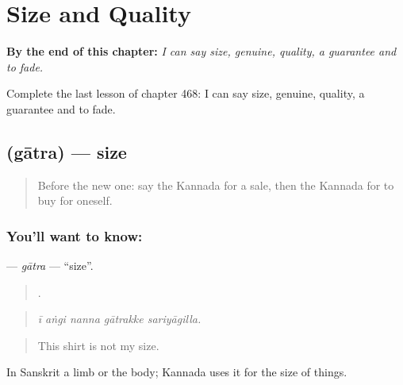 
\chapter{Size and Quality}
\label{ch:ka-size-and-quality}

\begin{chapteropening}
\textbf{By the end of this chapter:} \emph{I can say size, genuine, quality, a guarantee and to fade.}

Complete the last lesson of chapter 468: I can say size, genuine, quality, a guarantee and to fade.
\end{chapteropening}

\section[\texorpdfstring{\kn{ಗಾತ್ರ} (gātra)}{ಗಾತ್ರ (gātra)}]{ (gātra) — size}

\label{lesson:KA-C468-gatra}



\begin{quote}
Before the new one: say the Kannada for a sale, then the Kannada for to buy for oneself.
\end{quote}

\subsection*{You'll want to know: }
\textbf{} — \emph{gātra} — \textquotedblleft{}size\textquotedblright{}.

\begin{quote}
    .
\end{quote}

\begin{quote}
\emph{ī aṅgi nanna gātrakke sariyāgilla.}
\end{quote}

\begin{quote}
This shirt is not my size.
\end{quote}

In Sanskrit a limb or the body; Kannada uses it for the size of things.

